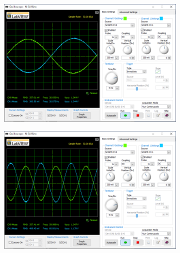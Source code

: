 \begin{figure}
	\centering
	\begin{subfigure}{0.8\linewidth}
		\centering
		\includegraphics[width=0.8\linewidth]{src/figures/exp10/20k-20hz-sin.png}
		\label{fig:exp10-20hz}
	\end{subfigure}
	\begin{subfigure}{0.8\linewidth}
		\centering
		\includegraphics[width=0.8\linewidth]{src/figures/exp10/20k-60hz-sin.png}
		\label{fig:exp10-60hz}
	\end{subfigure}
\end{figure}
